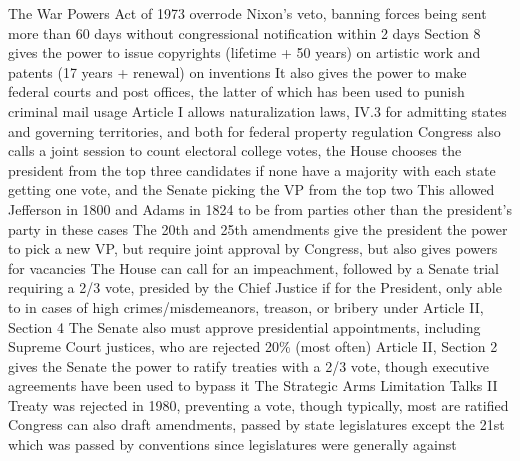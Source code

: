 \documentclass[11 pt, twoside]{article}
\newenvironment{outline*}
{
	\begin{outline}[enumerate]
	}
	{\end{outline}
}
\begin{document}
\begin{outline*}
\2 The War Powers Act of 1973 overrode Nixon’s veto, banning forces being sent more than 60 days without congressional notification within 2 days
\1 Section 8 gives the power to issue copyrights (lifetime + 50 years) on artistic work and patents (17 years + renewal) on inventions
\2 It also gives the power to make federal courts and post offices, the latter of which has been used to punish criminal mail usage
\1 Article I allows naturalization laws, IV.3 for admitting states and governing territories, and both for federal property regulation
\1 Congress also calls a joint session to count electoral college votes, the House chooses the president from the top three candidates if none have a majority with each state getting one vote, and the Senate picking the VP from the top two
\2 This allowed Jefferson in 1800 and Adams in 1824 to be from parties other than the president’s party in these cases
\1 The 20th and 25th amendments give the president the power to pick a new VP, but require joint approval by Congress, but also gives powers for vacancies
\2 The House can call for an impeachment, followed by a Senate trial requiring a 2/3 vote, presided by the Chief Justice if for the President, only able to in cases of high crimes/misdemeanors, treason, or bribery under Article II, Section 4
\2 The Senate also must approve presidential appointments, including Supreme Court justices, who are rejected 20\% (most often)
\1 Article II, Section 2 gives the Senate the power to ratify treaties with a 2/3 vote, though executive agreements have been used to bypass it
\2 The Strategic Arms Limitation Talks II Treaty was rejected in 1980, preventing a vote, though typically, most are ratified
\1 Congress can also draft amendments, passed by state legislatures except the 21st which was passed by conventions since legislatures were generally against
\end{outline*}
\end{document}

